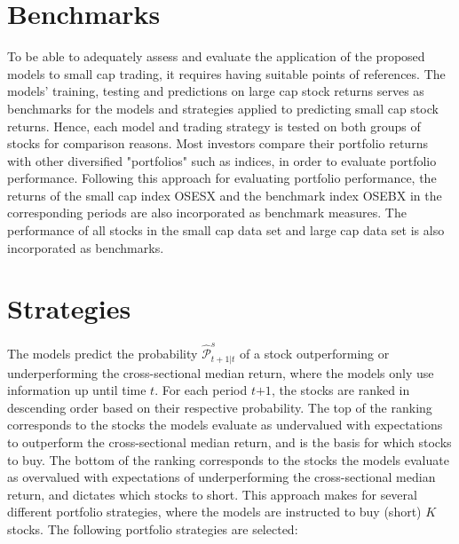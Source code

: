 \section{Benchmarks}
To be able to adequately assess and evaluate the application of the proposed models to small cap trading, it requires having suitable points of references. The models' training, testing and predictions on large cap stock returns serves as benchmarks for the models and strategies applied to predicting small cap stock returns. Hence, each model and trading strategy is tested on both groups of stocks for comparison reasons. Most investors compare their portfolio returns with other diversified "portfolios" such as indices, in order to evaluate portfolio performance. Following this approach for evaluating portfolio performance, the returns of the small cap index OSESX and the benchmark index OSEBX in the corresponding periods are also incorporated as benchmark measures. The performance of all stocks in the small cap data set and large cap data set is also incorporated as benchmarks. 

\section{Strategies}
The models predict the probability $\widehat{\mathcal{P}}^{s}_{t+1|t}$ of a stock outperforming or underperforming the cross-sectional median return, where the models only use information up until time $\textit{t}$. For each period $\textit{t+1}$, the stocks are ranked in descending order based on their respective probability. The top of the ranking corresponds to the stocks the models evaluate as undervalued with expectations to outperform the cross-sectional median return, and is the basis for which stocks to buy. The bottom of the ranking corresponds to the stocks the models evaluate as overvalued with expectations of underperforming the cross-sectional median return, and dictates which stocks to short. This approach makes for several different portfolio strategies, where the models are instructed to buy (short) $\textit{K}$ stocks. The following portfolio strategies are selected:

